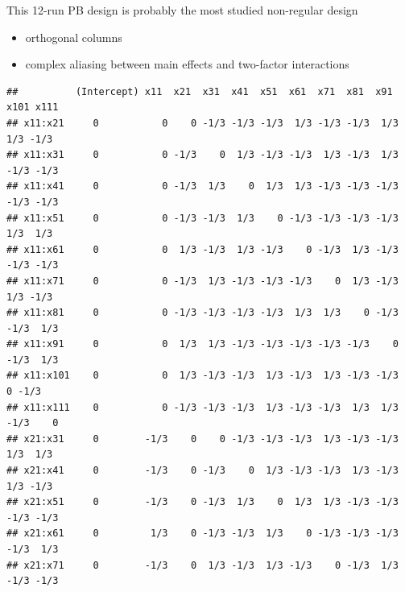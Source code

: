 \documentclass[
  ignorenonframetext,
]{beamer}
\newenvironment{Shaded}{\begin{snugshade}}{\end{snugshade}}
\newcommand{\AttributeTok}[1]{\textcolor[rgb]{0.77,0.63,0.00}{#1}}
\newcommand{\DecValTok}[1]{\textcolor[rgb]{0.00,0.00,0.81}{#1}}
\newcommand{\FunctionTok}[1]{\textcolor[rgb]{0.00,0.00,0.00}{#1}}
\newcommand{\NormalTok}[1]{#1}
\newcommand{\OtherTok}[1]{\textcolor[rgb]{0.56,0.35,0.01}{#1}}
\newcommand{\SpecialCharTok}[1]{\textcolor[rgb]{0.00,0.00,0.00}{#1}}
\providecommand{\tightlist}{%
  \setlength{\itemsep}{0pt}\setlength{\parskip}{0pt}}
\begin{document}
\begin{frame}[fragile]{}
\protect\hypertarget{section-17}{}
This 12-run PB design is probably the most studied non-regular design

\begin{itemize}
\tightlist
\item
  orthogonal columns
\item
  complex aliasing between main effects and two-factor interactions
\end{itemize}

\begin{Shaded}
\end{Shaded}

\begin{verbatim}
##          (Intercept) x11  x21  x31  x41  x51  x61  x71  x81  x91  x101 x111
## x11:x21     0           0    0 -1/3 -1/3 -1/3  1/3 -1/3 -1/3  1/3  1/3 -1/3
## x11:x31     0           0 -1/3    0  1/3 -1/3 -1/3  1/3 -1/3  1/3 -1/3 -1/3
## x11:x41     0           0 -1/3  1/3    0  1/3  1/3 -1/3 -1/3 -1/3 -1/3 -1/3
## x11:x51     0           0 -1/3 -1/3  1/3    0 -1/3 -1/3 -1/3 -1/3  1/3  1/3
## x11:x61     0           0  1/3 -1/3  1/3 -1/3    0 -1/3  1/3 -1/3 -1/3 -1/3
## x11:x71     0           0 -1/3  1/3 -1/3 -1/3 -1/3    0  1/3 -1/3  1/3 -1/3
## x11:x81     0           0 -1/3 -1/3 -1/3 -1/3  1/3  1/3    0 -1/3 -1/3  1/3
## x11:x91     0           0  1/3  1/3 -1/3 -1/3 -1/3 -1/3 -1/3    0 -1/3  1/3
## x11:x101    0           0  1/3 -1/3 -1/3  1/3 -1/3  1/3 -1/3 -1/3    0 -1/3
## x11:x111    0           0 -1/3 -1/3 -1/3  1/3 -1/3 -1/3  1/3  1/3 -1/3    0
## x21:x31     0        -1/3    0    0 -1/3 -1/3 -1/3  1/3 -1/3 -1/3  1/3  1/3
## x21:x41     0        -1/3    0 -1/3    0  1/3 -1/3 -1/3  1/3 -1/3  1/3 -1/3
## x21:x51     0        -1/3    0 -1/3  1/3    0  1/3  1/3 -1/3 -1/3 -1/3 -1/3
## x21:x61     0         1/3    0 -1/3 -1/3  1/3    0 -1/3 -1/3 -1/3 -1/3  1/3
## x21:x71     0        -1/3    0  1/3 -1/3  1/3 -1/3    0 -1/3  1/3 -1/3 -1/3
\end{verbatim}
\end{frame}
\end{document}
